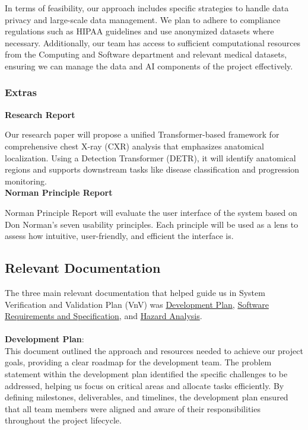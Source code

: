 \documentclass[12pt, titlepage]{article}
\newcommand{\srsurl}{https://github.com/RezaJodeiri/CXR-Capstone/blob/main/docs/SRS/SRS.pdf}
\begin{document}
\noindent In terms of feasibility, our approach includes specific strategies to handle data privacy and large-scale data management. We plan to adhere to compliance regulations such as HIPAA guidelines and use anonymized datasets where necessary. Additionally, our team has access to sufficient computational resources from the Computing and Software department and relevant medical datasets, ensuring we can manage the data and AI components of the project effectively.

\subsubsection{Extras}

\noindent \textbf{Research Report}

\noindent Our research paper will propose a unified Transformer-based framework for comprehensive chest X-ray (CXR) analysis that emphasizes anatomical localization. Using a Detection Transformer (DETR), it will identify anatomical regions and supports downstream tasks like disease classification and progression monitoring. \\

\noindent \textbf{Norman Principle Report}

\noindent Norman Principle Report will evaluate the user interface of the system based on Don Norman's seven usability principles. Each principle will be used as a lens to assess how intuitive, user-friendly, and efficient the interface is.\\

\subsection{Relevant Documentation}

The three main relevant documentation that helped guide us in System Verification and Validation Plan (VnV) was \href{https://github.com/RezaJodeiri/CXR-Capstone/blob/main/docs/DevelopmentPlan/DevelopmentPlan.pdf}{Development Plan}, \href{\srsurl}{Software Requirements and Specification}, and 
\href{https://github.com/RezaJodeiri/CXR-Capstone/blob/main/docs/HazardAnalysis/HazardAnalysis.pdf}{Hazard Analysis}.
\\\\
\textbf{Development Plan}:\\

\noindent This document outlined the approach and resources needed to achieve our project goals, providing a clear roadmap for the development team. The problem statement within the development plan identified the specific challenges to be addressed, helping us focus on critical areas and allocate tasks efficiently. By defining milestones, deliverables, and timelines, the development plan ensured that all team members were aligned and aware of their responsibilities throughout the project lifecycle.\\
\end{document}
